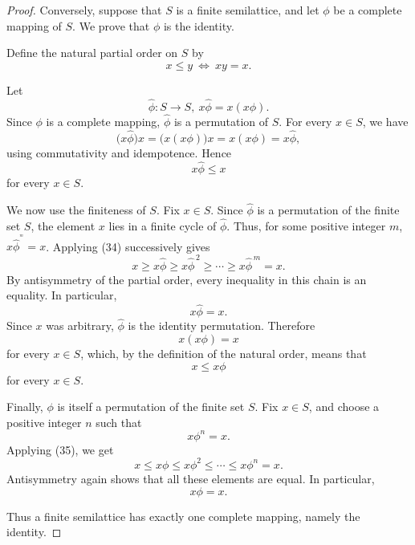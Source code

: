 \documentclass[10pt,a4paper]{amsart}
\begin{document}
\begin{proof}
    Conversely, suppose that $S$ is a finite semilattice, and let $\phi$
    be a complete mapping of $S$. We prove that $\phi$ is the identity.

    Define the natural partial order on $S$ by
    \[
        x\leq y
        \ \Leftrightarrow\ 
        xy=x.
    \]


    Let
    \[
        \widehat{\phi}\colon S\rightarrow S,
        \ 
        x\widehat{\phi}=x(x\phi).
    \]
    Since $\phi$ is a complete mapping, $\widehat{\phi}$ is a permutation
    of $S$. For every $x\in S$, we have
    \[
        \bigl(x\widehat{\phi}\bigr)x
        =\bigl(x(x\phi)\bigr)x
        =x(x\phi)
        =x\widehat{\phi},
    \]
    using commutativity and idempotence. Hence
    \[x\widehat{\phi}\leq x
        \tag{34}
    \]
    for every $x\in S$.

    We now use the finiteness of $S$. Fix $x\in S$. Since
    $\widehat{\phi}$ is a permutation of the finite set $S$, the element
    $x$ lies in a finite cycle of $\widehat{\phi}$. Thus, for some
    positive integer $m$,
$x{\widehat{\phi}}^{^{^{m}}}=x$.
    Applying (34) successively gives
    \[
        x
        \geq x\widehat{\phi}
        \geq x\widehat{\phi}^{\,2}
        \geq\cdots
        \geq x\widehat{\phi}^{\,m}
        =x.
    \]
    By antisymmetry of the partial order, every inequality in this chain
    is an equality. In particular,
    \[
        x\widehat{\phi}=x.
    \]
    Since $x$ was arbitrary, $\widehat{\phi}$ is the identity
    permutation. Therefore
    \[
        x(x\phi)=x
    \]
    for every $x\in S$, which, by the definition of the natural order,
    means that
    \[
        x\leq x\phi
        \tag{35}
    \]
    for every $x\in S$.

    Finally, $\phi$ is itself a permutation of the finite set $S$. Fix
    $x\in S$, and choose a positive integer $n$ such that
    \[
        x\phi^n=x.
    \]
    Applying (35), we get
    \[
        x
        \leq x\phi
        \leq x\phi^2
        \leq\cdots
        \leq x\phi^n
        =x.
    \]
    Antisymmetry again shows that all these elements are equal. In
    particular,
    \[
        x\phi=x.
    \]
    
    Thus a finite semilattice has exactly one complete mapping, namely
    the identity.
\end{proof}
\end{document}
